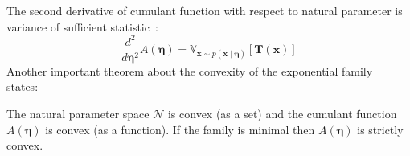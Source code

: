 The second derivative of cumulant function with respect to natural parameter is variance of sufficient statistic~\cite{exp-family-jorden-2009}:
$$
\frac{d^2}{d \boldsymbol{\eta}^2} A(\boldsymbol{\eta}) = \mathbb{V}_{\boldsymbol{x} \sim p(\boldsymbol{x}\mid \boldsymbol{\eta})} [\boldsymbol{T}(\boldsymbol{x})]
$$
Another important theorem about the convexity of the exponential family~\cite{exp-family-jorden-2009} states:
\begin{theorem}
The natural parameter space $\mathcal{N}$ is convex (as a set) and the cumulant function $A(\boldsymbol{\eta})$ is convex (as a function). 
If the family is minimal then $A(\boldsymbol{\eta})$ is strictly convex.
\end{theorem}


